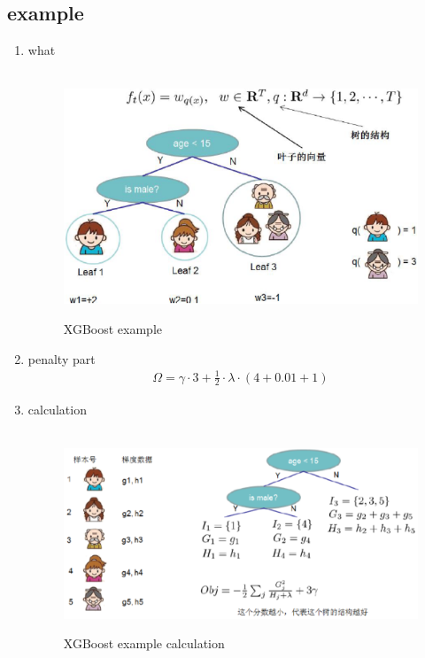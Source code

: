 \documentclass[12pt]{ctexart}%
\begin{document}
		\subsection{\quad example}
			\begin{enumerate}
				\item what
					\begin{figure}[H]
						\vspace{-0.2cm}  %
						\setlength{\abovecaptionskip}{-0.2cm}   %
						\centering
						\includegraphics[scale=0.8]{XGBoost_example.png}
						\renewcommand{\figurename}{Fig} %
						\caption{XGBoost example}
						\label{fig:2}
					\end{figure}
				
				\item penalty part
					\begin{align}
						\Omega = \gamma \cdot 3 + \frac{1}{2} \cdot \lambda \cdot (4 + 0.01 + 1)
					\end{align}
					
				\item calculation
					\begin{figure}[H]
						\vspace{-0.2cm}  %
						\setlength{\abovecaptionskip}{-0.2cm}   %
						\centering
						\includegraphics[scale=0.6]{XGBoost_example_calculation.png}
						\renewcommand{\figurename}{Fig} %
						\caption{XGBoost example calculation}
						\label{fig:3}
					\end{figure}
				

\end{enumerate}
\end{document}
